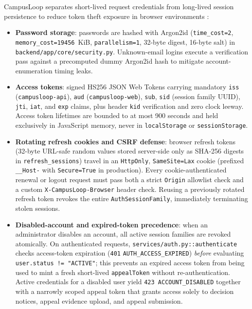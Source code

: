 CampusLoop separates short-lived request credentials from long-lived session persistence to reduce token theft exposure in browser environments \cite{owaspSession}:
\begin{itemize}
  \item \textbf{Password storage}: passwords are hashed with Argon2id \cite{rfc9106} (\texttt{time\_cost=2}, \texttt{memory\_\allowbreak cost=19456}~KiB, \texttt{parallelism=1}, 32-byte digest, 16-byte salt) in \texttt{backend/\allowbreak app/\allowbreak core/\allowbreak security.py}. Unknown-email logins execute a verification pass against a precomputed dummy Argon2id hash to mitigate account-enumeration timing leaks.
  \item \textbf{Access tokens}: signed HS256 JSON Web Tokens \cite{rfc7519} carrying mandatory \texttt{iss} (\texttt{campusloop-api}), \texttt{aud} (\texttt{campusloop-web}), \texttt{sub}, \texttt{sid} (session family UUID), \texttt{jti}, \texttt{iat}, and \texttt{exp} claims, plus header \texttt{kid} verification and zero clock leeway. Access token lifetimes are bounded to at most 900 seconds and held exclusively in JavaScript memory, never in \texttt{localStorage} or \texttt{sessionStorage}.
  \item \textbf{Rotating refresh cookies and CSRF defense}: browser refresh tokens (32-byte URL-safe random values stored server-side only as SHA-256 digests in \texttt{refresh\_sessions}) travel in an \texttt{HttpOnly}, \texttt{SameSite=Lax} cookie \cite{rfc6265} (prefixed \texttt{\_\_Host-} with \texttt{Secure=True} in production). Every cookie-authenticated renewal or logout request must pass both a strict \texttt{Origin} allowlist check and a custom \texttt{X-CampusLoop-Browser} header check. Reusing a previously rotated refresh token revokes the entire \texttt{AuthSessionFamily}, immediately terminating stolen sessions.
  \item \textbf{Disabled-account and expired-token precedence}: when an administrator disables an account, all active session families are revoked atomically. On authenticated requests, \texttt{services/auth.py::\allowbreak authenticate} checks access-token expiration (\texttt{401} \texttt{AUTH\_\allowbreak ACCESS\_\allowbreak EXPIRED}) \emph{before} evaluating \texttt{user.status != "ACTIVE"}; this prevents an expired access token from being used to mint a fresh short-lived \texttt{appealToken} without re-authentication. Active credentials for a disabled user yield \texttt{423 ACCOUNT\_DISABLED} together with a narrowly scoped appeal token that grants access solely to decision notices, appeal evidence upload, and appeal submission.
\end{itemize}

